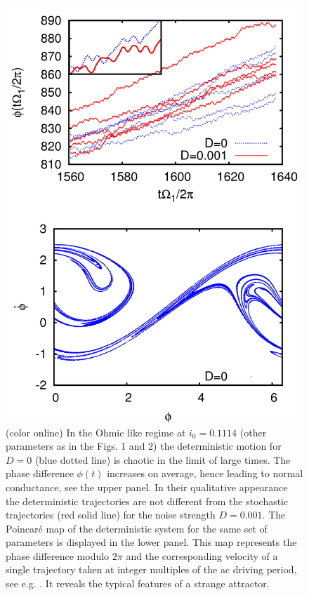 \documentclass{physeauth}
\begin{document}
\begin{figure}
\includegraphics[width=1\linewidth]{fig3} 
\caption{(color online) 
In the Ohmic like regime at $i_0=0.1114$ (other parameters as in the
Figs. 1 and 2) the deterministic motion for $D=0$ (blue dotted line)
is chaotic in the limit of large times. The phase difference $\phi(t)$ 
increases on average, hence leading
to normal conductance, see the upper panel. 
In their qualitative appearance the deterministic trajectories are not
different from the stochastic trajectories (red solid line) 
for the noise strength
$D=0.001$. The Poincar\'e map of the
deterministic system for the same set of parameters is displayed in
the lower panel.  This map represents the 
phase difference modulo $2 \pi$ and the corresponding velocity of a single
trajectory taken at
integer multiples of the ac driving period, see e.g. \cite{Strogatz}.
It reveals the
typical features of a strange attractor.}     
\label{fig3}
\end{figure}
\end{document}
